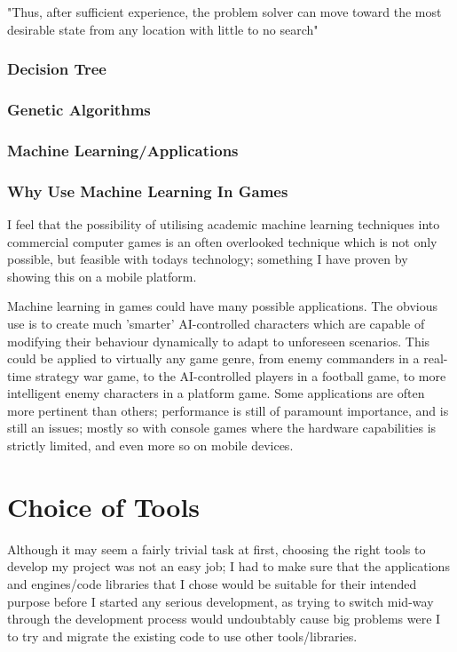 \documentclass[a4paper,oneside]{report}
\begin{document}
"Thus, after sufficient experience, the problem solver can move toward the most desirable state from any location with little to no search"

\subsection{Decision Tree}

\subsection{Genetic Algorithms}

\subsection{Machine Learning/Applications}

\subsection{Why Use Machine Learning In Games}

I feel that the possibility of utilising academic machine learning techniques into commercial computer games is an often overlooked technique which is not only possible, but feasible with todays technology; something I have proven by showing this on a mobile platform. 

Machine learning in games could have many possible applications. The obvious use is to create much 'smarter' AI-controlled characters which are capable of modifying their behaviour dynamically to adapt to unforeseen scenarios. This could be applied to virtually any game genre, from enemy commanders in a real-time strategy war game, to the AI-controlled players in a football game, to more intelligent enemy characters in a platform game. Some applications are often more pertinent than others; performance is still of paramount importance, and is still an issues; mostly so with console games where the hardware capabilities is strictly limited, and even more so on mobile devices.
	
\chapter{Choice of Tools}

Although it may seem a fairly trivial task at first, choosing the right tools to develop my project was not an easy job; I had to make sure that the applications and engines/code libraries that I chose would be suitable for their intended purpose before I started any serious development, as trying to switch mid-way through the development process would undoubtably cause big problems were I to try and migrate the existing code to use other tools/libraries.
\end{document}
